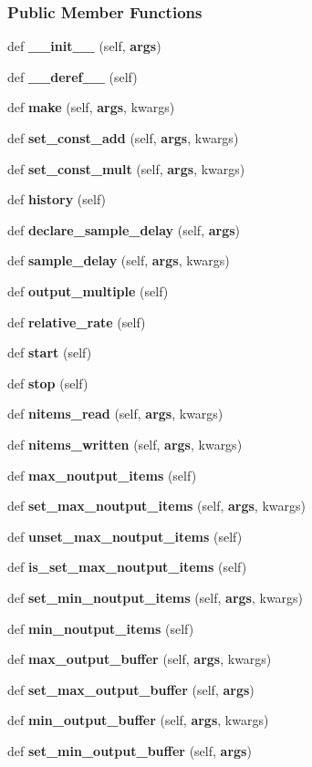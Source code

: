 \subsubsection*{Public Member Functions}
\begin{DoxyCompactItemize}
\item 
def {\bf \+\_\+\+\_\+init\+\_\+\+\_\+} (self, {\bf args})
\item 
def {\bf \+\_\+\+\_\+deref\+\_\+\+\_\+} (self)
\item 
def {\bf make} (self, {\bf args}, kwargs)
\item 
def {\bf set\+\_\+const\+\_\+add} (self, {\bf args}, kwargs)
\item 
def {\bf set\+\_\+const\+\_\+mult} (self, {\bf args}, kwargs)
\item 
def {\bf history} (self)
\item 
def {\bf declare\+\_\+sample\+\_\+delay} (self, {\bf args})
\item 
def {\bf sample\+\_\+delay} (self, {\bf args}, kwargs)
\item 
def {\bf output\+\_\+multiple} (self)
\item 
def {\bf relative\+\_\+rate} (self)
\item 
def {\bf start} (self)
\item 
def {\bf stop} (self)
\item 
def {\bf nitems\+\_\+read} (self, {\bf args}, kwargs)
\item 
def {\bf nitems\+\_\+written} (self, {\bf args}, kwargs)
\item 
def {\bf max\+\_\+noutput\+\_\+items} (self)
\item 
def {\bf set\+\_\+max\+\_\+noutput\+\_\+items} (self, {\bf args}, kwargs)
\item 
def {\bf unset\+\_\+max\+\_\+noutput\+\_\+items} (self)
\item 
def {\bf is\+\_\+set\+\_\+max\+\_\+noutput\+\_\+items} (self)
\item 
def {\bf set\+\_\+min\+\_\+noutput\+\_\+items} (self, {\bf args}, kwargs)
\item 
def {\bf min\+\_\+noutput\+\_\+items} (self)
\item 
def {\bf max\+\_\+output\+\_\+buffer} (self, {\bf args}, kwargs)
\item 
def {\bf set\+\_\+max\+\_\+output\+\_\+buffer} (self, {\bf args})
\item 
def {\bf min\+\_\+output\+\_\+buffer} (self, {\bf args}, kwargs)
\item 
def {\bf set\+\_\+min\+\_\+output\+\_\+buffer} (self, {\bf args})

\end{DoxyCompactItemize}
